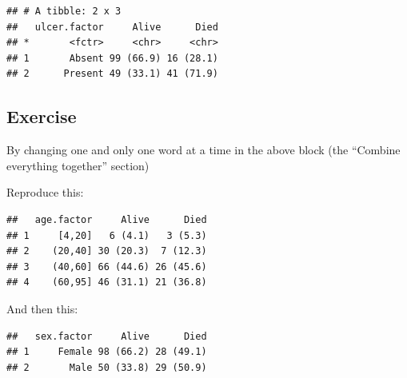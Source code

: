 \documentclass[]{book}
\makeatletter
\newenvironment{Shaded}{\begin{snugshade}}{\end{snugshade}}
\newcommand{\KeywordTok}[1]{\textcolor[rgb]{0.13,0.29,0.53}{\textbf{#1}}}
\newcommand{\DataTypeTok}[1]{\textcolor[rgb]{0.13,0.29,0.53}{#1}}
\newcommand{\DecValTok}[1]{\textcolor[rgb]{0.00,0.00,0.81}{#1}}
\newcommand{\StringTok}[1]{\textcolor[rgb]{0.31,0.60,0.02}{#1}}
\newcommand{\OperatorTok}[1]{\textcolor[rgb]{0.81,0.36,0.00}{\textbf{#1}}}
\newcommand{\NormalTok}[1]{#1}
\newenvironment{kframe}{%
\medskip{}
\setlength{\fboxsep}{.8em}
 \def\at@end@of@kframe{}%
 \ifinner\ifhmode%
  \def\at@end@of@kframe{\end{minipage}}%
  \begin{minipage}{\columnwidth}%
 \fi\fi%
 \def\FrameCommand##1{\hskip\@totalleftmargin \hskip-\fboxsep
 \colorbox{shadecolor}{##1}\hskip-\fboxsep
     \hskip-\linewidth \hskip-\@totalleftmargin \hskip\columnwidth}%
 \MakeFramed {\advance\hsize-\width
   \@totalleftmargin\z@ \linewidth\hsize
   \@setminipage}}%
 {\par\unskip\endMakeFramed%
 \at@end@of@kframe}
\renewenvironment{Shaded}{\begin{kframe}}{\end{kframe}}
\makeatother
\begin{document}
\begin{Shaded}
\end{Shaded}

\begin{verbatim}
## # A tibble: 2 x 3
##   ulcer.factor     Alive      Died
## *       <fctr>     <chr>     <chr>
## 1       Absent 99 (66.9) 16 (28.1)
## 2      Present 49 (33.1) 41 (71.9)
\end{verbatim}

\subsection{Exercise}\label{exercise-42}

By changing one and only one word at a time in the above block (the
``Combine everything together'' section)

Reproduce this:

\begin{verbatim}
##   age.factor     Alive      Died
## 1     [4,20]   6 (4.1)   3 (5.3)
## 2    (20,40] 30 (20.3)  7 (12.3)
## 3    (40,60] 66 (44.6) 26 (45.6)
## 4    (60,95] 46 (31.1) 21 (36.8)
\end{verbatim}

And then this:

\begin{verbatim}
##   sex.factor     Alive      Died
## 1     Female 98 (66.2) 28 (49.1)
## 2       Male 50 (33.8) 29 (50.9)
\end{verbatim}
\end{document}
